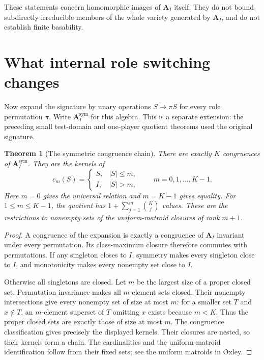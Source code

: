 \documentclass[11pt]{article}
\newtheorem{theorem}{Theorem}[section]
\newcommand{\A}{\mathbf A_I}
\begin{document}
These statements concern homomorphic images of $\A$ itself. They do not
bound subdirectly irreducible members of the whole variety generated by
$\A$, and do not establish finite basability.

\section{What internal role switching changes}

Now expand the signature by unary operations $S\mapsto\pi S$ for every
role permutation $\pi$. Write $\A^{\mathrm{sym}}$ for this algebra. This
is a separate extension: the preceding small test-domain and one-player
quotient theorems used the original signature.

\begin{theorem}[The symmetric congruence chain]\label{thm:sym}
There are exactly $K$ congruences of $\A^{\mathrm{sym}}$. They are the
kernels of
\[
 c_m(S)=\begin{cases}S,&|S|\leq m,\\I,&|S|>m,\end{cases}
 \qquad m=0,1,\ldots,K-1.
\]
Here $m=0$ gives the universal relation and $m=K-1$ gives equality.
For $1\leq m\leq K-1$, the quotient has
$1+\sum_{j=1}^{m}\binom Kj$ values. These are the restrictions to
nonempty sets of the uniform-matroid closures of rank $m+1$.
\end{theorem}
\begin{proof}
A congruence of the expansion is exactly a congruence of $\A$ invariant
under every permutation. Its class-maximum closure therefore commutes
with permutations. If any singleton closes to $I$, symmetry makes every
singleton close to $I$, and monotonicity makes every nonempty set close
to $I$.

Otherwise all singletons are closed. Let $m$ be the largest size of a
proper closed set. Permutation invariance makes all $m$-element sets
closed. Their nonempty intersections give every nonempty set of size at
most $m$: for a smaller set $T$ and $x\notin T$, an $m$-element superset
of $T$ omitting $x$ exists because $m<K$. Thus the proper closed sets
are exactly those of size at most $m$. The congruence classification
gives precisely the displayed kernels. Their closures are nested, so
their kernels form a chain. The cardinalities and the uniform-matroid
identification follow from their fixed sets; see the uniform matroids
in Oxley\cite{Oxley2011}.
\end{proof}
\end{document}
